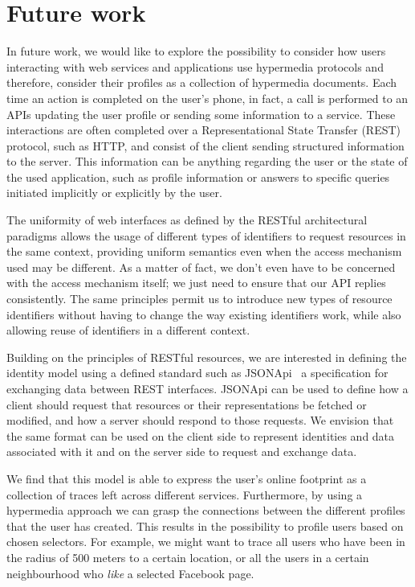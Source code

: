 \section{Future work}

In future work, we would like to explore the possibility to consider how users interacting with web services and applications use hypermedia protocols and therefore, consider their profiles as a collection of hypermedia documents. Each time an action is completed on the user's phone, in fact, a call is performed to an APIs updating the user profile or sending some information to a service. These interactions are often completed over a Representational State Transfer (REST) protocol, such as HTTP, and consist of the client sending structured information to the server. This information can be anything regarding the user or the state of the used application, such as profile information or answers to specific queries initiated implicitly or explicitly by the user.

The uniformity of web interfaces as defined by the RESTful architectural paradigms allows the usage of different types of identifiers to request resources in the same context, providing uniform semantics even when the access mechanism used may be different. As a matter of fact, we don't even have to be concerned with the access mechanism itself; we just need to ensure that our API replies consistently. The same principles permit us to introduce new types of resource identifiers without having to change the way existing identifiers work, while also allowing reuse of identifiers in a different context.

Building on the principles of RESTful resources, we are interested in defining the identity model using a defined standard such as JSONApi~\cite{Jsonapi} a specification for exchanging data between REST interfaces. JSONApi can be used to define how a client should request that resources or their representations be fetched or modified, and how a server should respond to those requests. We envision that the same format can be used on the client side to represent identities and data associated with it and on the server side to request and exchange data.

We find that this model is able to express the user's online footprint as a collection of traces left across different services. Furthermore, by using a hypermedia approach we can grasp the connections between the different profiles that the user has created. This results in the possibility to profile users based on chosen selectors. For example, we might want to trace all users who have been in the radius of 500 meters to a certain location, or all the users in a certain neighbourhood who \emph{like} a selected Facebook page.


